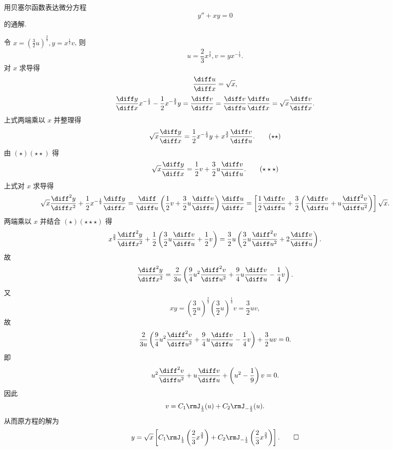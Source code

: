 \begin{exercise}
  用贝塞尔函数表达微分方程
  \[y''+xy=0\]
  的通解.
\end{exercise}

\begin{solve} 
  令 $x=\left(\frac{3}{2}u\right)^{\frac{2}{3}},y=x^{\frac{1}{2}}v$, 则
  \begin{equation}
    u=\frac{2}{3}x^{\frac{3}{2}},v=yx^{-\frac{1}{2}}. \tag{$\star$}
  \end{equation}
  对 $x$ 求导得
  \[\frac{\diff u}{\diff x}=\sqrt{x},\]
  \[\frac{\diff y}{\diff x}x^{-\frac{1}{2}}-\frac{1}{2}x^{-\frac{3}{2}}y
    = \frac{\diff v}{\diff x}=\frac{\diff v}{\diff u}\frac{\diff u}{\diff x}
    = \sqrt{x}\frac{\diff v}{\diff x}.\]
  上式两端乘以 $x$ 并整理得
  \begin{equation}
    \sqrt{x}\frac{\diff y}{\diff x}
      = \frac{1}{2}x^{-\frac{1}{2}}y+x^{\frac{3}{2}}\frac{\diff v}{\diff u}.
    \tag{$\star\star$}
  \end{equation}
  由 $(\star)(\star\star)$ 得
  \begin{equation}
    \sqrt{x}\frac{\diff y}{\diff x}=\frac{1}{2}v+\frac{3}{2}u\frac{\diff v}{\diff u}.
    \tag{$\star\star\star$}
  \end{equation}
  上式对 $x$ 求导得
  \[\sqrt{x}\frac{\diff^2y}{\diff x^2}+\frac{1}{2}x^{-\frac{1}{2}}\frac{\diff y}{\diff x}
    = \frac{\diff}{\diff u}\left(\frac{1}{2}v+\frac{3}{2}u\frac{\diff v}{\diff u}\right)\frac{\diff u}{\diff x}
    = \left[\frac{1}{2}\frac{\diff v}{\diff u}+\frac{3}{2}\left(\frac{\diff v}{\diff u}+u\frac{\diff^2v}{\diff u^2}\right)\right]\sqrt{x}.\]
  两端乘以 $x$ 并结合 $(\star)(\star\star\star)$ 得
  \[x^{\frac{3}{2}}\frac{\diff^2y}{\diff x^2}
    + \frac{1}{2}\left(\frac{3}{2}u\frac{\diff v}{\diff u}
    + \frac{1}{2}v\right)
    = \frac{3}{2}u\left(\frac{3}{2}u\frac{\diff^2v}{\diff u^2}+2\frac{\diff v}{\diff u}\right).\]
  故
  \[\frac{\diff^2y}{\diff x^2}=\frac{2}{3u}\left(\frac{9}{4}u^2\frac{\diff^2v}{\diff u^2}+\frac{9}{4}u\frac{\diff v}{\diff u}-\frac{1}{4}v\right).\]
  又
  \[xy=\left(\frac{3}{2}u\right)^{\frac{2}{3}}\left(\frac{3}{2}u\right)^{\frac{1}{3}}v=\frac{3}{2}uv,\]
  故
  \[\frac{2}{3u}\left(\frac{9}{4}u^2\frac{\diff^2v}{\diff u^2}+\frac{9}{4}u\frac{\diff v}{\diff u}-\frac{1}{4}v\right)+\frac{3}{2}uv=0.\]
  即
  \[u^2\frac{\diff^2v}{\diff u^2}+u\frac{\diff v}{\diff u}+\left(u^2-\frac{1}{9}\right)v=0.\]
  因此
  \[v=C_1\rmJ_{\frac{1}{3}}(u)+C_2\rmJ_{-\frac{1}{3}}(u).\]
  从而原方程的解为
  \[y=\sqrt{x}\left[C_1\rmJ_{\frac{1}{3}}\left(\frac{2}{3}x^{\frac{3}{2}}\right)+C_2\rmJ_{-\frac{1}{3}}\left(\frac{2}{3}x^{\frac{3}{2}}\right)\right].\qedhere\]
\end{solve}